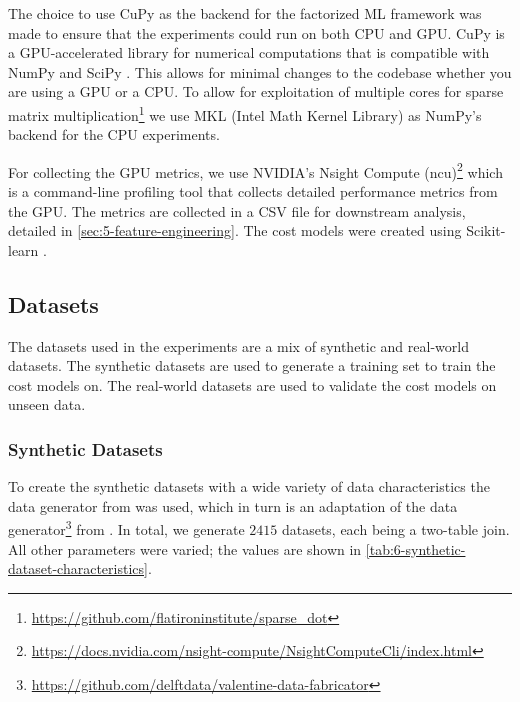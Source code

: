 The choice to use CuPy as the backend for the factorized ML framework was made to ensure that the experiments could run on both CPU and GPU. CuPy is a GPU-accelerated library for numerical computations that is compatible with NumPy and SciPy \cite{cupy_learningsys2017}. This allows for minimal changes to the codebase whether you are using a GPU or a CPU. To allow for exploitation of multiple cores for sparse matrix multiplication\footnote{\url{https://github.com/flatironinstitute/sparse_dot}} we use MKL (Intel Math Kernel Library) \cite{intel-mkl} as NumPy's backend for the CPU experiments.

For collecting the GPU metrics, we use NVIDIA's Nsight Compute (ncu)\footnote{\url{https://docs.nvidia.com/nsight-compute/NsightComputeCli/index.html}} which is a command-line profiling tool that collects detailed performance metrics from the GPU. The metrics are collected in a CSV file for downstream analysis, detailed in \autoref{sec:5-feature-engineering}. The cost models were created using Scikit-learn \cite{scikit-learn}.

\subsection{Datasets}
\label{subsec:6-datasets}
The datasets used in the experiments are a mix of synthetic and real-world datasets. The synthetic datasets are used to generate a training set to train the cost models on. The real-world datasets are used to validate the cost models on unseen data.

\subsubsection{Synthetic Datasets}
To create the synthetic datasets with a wide variety of data characteristics the data generator from \cite{amalur_tkde24} was used, which in turn is an adaptation of the data generator\footnote{\url{https://github.com/delftdata/valentine-data-fabricator}} from \cite{valentine-data-generator}. In total, we generate $2415$ datasets, each being a two-table join. All other parameters were varied; the values are shown in \autoref{tab:6-synthetic-dataset-characteristics}.


